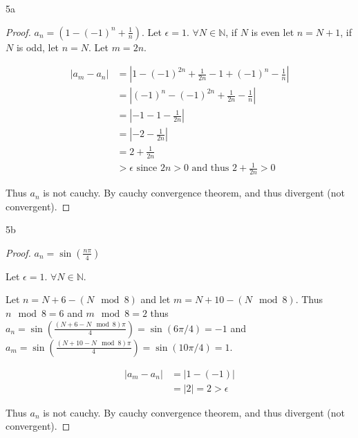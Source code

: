 \documentclass{article}
\newcommand{\N}{\mathbb{N}}
\newcommand{\abs}[1]{\left\lvert#1\right\rvert}
\begin{document}
\bigskip

\begin{PROB}{5a}\label{Problem 5a.}
\end{PROB}
\begin{proof}
    $a_n = (1 - (-1)^n + \frac{1}{n})$. 
    Let $\epsilon = 1$. $\forall N \in \N$, if $N$ is even let $n = N + 1$, if $N$ is odd, let $n = N$. Let $m = 2n$.           

    \begin{align*}
        \abs{a_{m} - a_n} &= \abs{1 - (-1)^{2n} + \frac{1}{2n} - 1 + (-1)^n - \frac{1}{n}} \\
        &= \abs{(-1)^n - (-1)^{2n} + \frac{1}{2n} - \frac{1}{n}} \\
        &= \abs{-1 - 1 - \frac{1}{2n}} \\
        &= \abs{-2 - \frac{1}{2n}} \\
        &= 2 + \frac{1}{2n} \\
        &> \epsilon \text{ since $2n > 0$ and thus $2 + \frac{1}{2n} > 0$ }
    \end{align*}

    Thus $a_n$ is not cauchy. By cauchy convergence theorem, and thus divergent (not convergent).  
\end{proof}

\begin{PROB}{5b}\label{Problem 5b.}
\end{PROB}
\begin{proof}
    $a_n = \sin(\frac{n\pi}{4})$

    Let $\epsilon = 1$. $\forall N \in \N$.
    
    Let $n = N + 6 - (N \mod 8)$ and let $m = N + 10 - (N \mod 8)$. Thus $n \mod 8 = 6$ and $m \mod 8 = 2$ thus $a_n = \sin(\frac{(N + 6 - N \mod 8) \pi}{4}) = \sin(6 \pi / 4) =  -1$ and $a_m = \sin(\frac{(N + 10 - N \mod 8) \pi}{4}) = \sin(10 \pi /4) = 1$.      
    
    \begin{align*}
        \abs{a_m - a_n} &= \abs{1 - (-1)} \\
        &= \abs{2} = 2 > \epsilon
    \end{align*}

    Thus $a_n$ is not cauchy. By cauchy convergence theorem, and thus divergent (not convergent).  
\end{proof}

\bigskip
\end{document}
